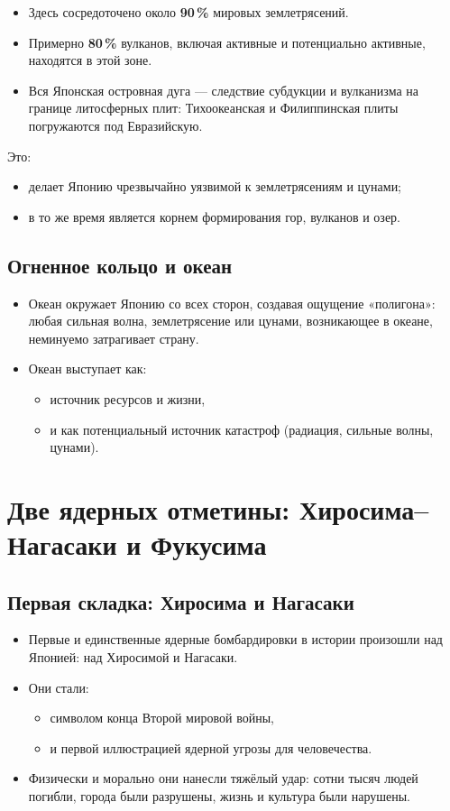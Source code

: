 \documentclass[12pt]{article}
\begin{document}
\begin{itemize}
  \item Здесь сосредоточено около \textbf{90\,\%} мировых землетрясений.
  \item Примерно \textbf{80\,\%} вулканов, включая активные и потенциально активные, находятся в этой зоне.
  \item Вся Японская островная дуга — следствие субдукции и вулканизма на границе литосферных плит: Тихоокеанская и Филиппинская плиты погружаются под Евразийскую.
\end{itemize}

Это:

\begin{itemize}
  \item делает Японию чрезвычайно уязвимой к землетрясениям и цунами;
  \item в то же время является корнем формирования гор, вулканов и озер.
\end{itemize}

\subsection{Огненное кольцо и океан}

\begin{itemize}
  \item Океан окружает Японию со всех сторон, создавая ощущение «полигона»: любая сильная волна, землетрясение или цунами, возникающее в океане, неминуемо затрагивает страну.
  \item Океан выступает как:
    \begin{itemize}
      \item источник ресурсов и жизни,
      \item и как потенциальный источник катастроф (радиация, сильные волны, цунами).
    \end{itemize}
\end{itemize}

\section{Две ядерных отметины: Хиросима–Нагасаки и Фукусима}

\subsection{Первая складка: Хиросима и Нагасаки}

\begin{itemize}
  \item Первые и единственные ядерные бомбардировки в истории произошли над Японией: над Хиросимой и Нагасаки.
  \item Они стали:
    \begin{itemize}
      \item символом конца Второй мировой войны,
      \item и первой иллюстрацией ядерной угрозы для человечества.
    \end{itemize}
  \item Физически и морально они нанесли тяжёлый удар: сотни тысяч людей погибли, города были разрушены, жизнь и культура были нарушены.
\end{itemize}
\end{document}
